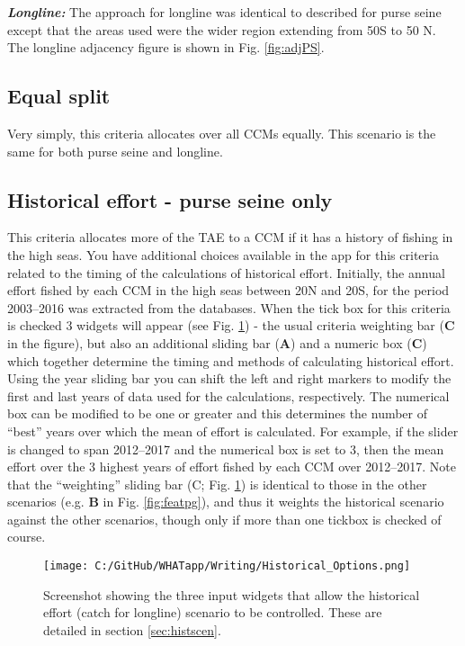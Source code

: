 \documentclass[11pt]{article}
\begin{document}
\noindent\textbf{\emph{Longline:}}
The approach for longline was identical to described for purse seine except that the areas used were the wider region extending from 50\degree S to 50 \degree N. The longline adjacency figure is shown in Fig. \ref{fig:adjPS}.%

\subsection*{Equal split}
Very simply, this criteria allocates over all CCMs equally. This scenario is the same for both purse seine and longline.

\subsection*{Historical effort - purse seine only} \label{sec:histscen}
This criteria allocates more of the TAE to a CCM if it has a history of fishing in the high seas. You have additional choices available in the app for this criteria related to the timing of the calculations of historical effort. Initially, the annual effort fished by each CCM in the high seas between 20\degree N and 20\degree S, for the period 2003--2016 was extracted from the databases. When the tick box for this criteria is checked 3 widgets will appear (see Fig. \ref{fig:HistOp}) - the usual criteria weighting bar ({\bf C} in the figure), but also an additional sliding bar ({\bf A}) and a numeric box ({\bf C}) which together determine the timing and methods of calculating historical effort. Using the year sliding bar you can shift the left and right markers to modify the first and last years of data used for the calculations, respectively. The numerical box can be modified to be one or greater and this determines the number of ``best'' years over which the mean of effort is calculated. For example, if the slider is changed to span 2012--2017 and the numerical box is set to 3, then the mean effort over the 3 highest years of effort fished by each CCM over 2012--2017. Note that the ``weighting'' sliding bar ({C}; Fig. \ref{fig:HistOp}) is identical to those in the other scenarios (e.g. {\bf B} in Fig. \ref{fig:featpg}), and thus it weights the historical scenario against the other scenarios, though only if more than one tickbox is checked of course.

\newpage
 \begin{figure} [h]
  \centering
\texttt{[image: C:/GitHub/WHATapp/Writing/Historical\_Options.png]}
  \caption {Screenshot showing the three input widgets that allow the historical effort (catch for longline) scenario to be controlled. These are detailed in section \ref{sec:histscen}.}
  \label{fig:HistOp}
\end{figure}
\end{document}
